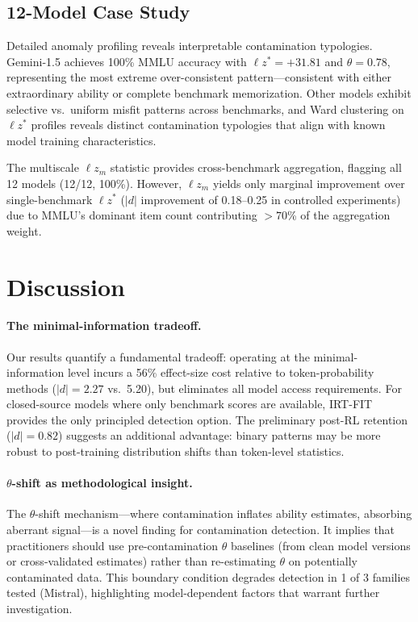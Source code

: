 \documentclass[11pt,a4paper]{article}
\begin{document}
\subsection{12-Model Case Study}

Detailed anomaly profiling reveals interpretable contamination typologies.
Gemini-1.5 achieves 100\% MMLU accuracy with $\ell z^*{=}+31.81$ and $\theta{=}0.78$, representing the most extreme over-consistent pattern---consistent with either extraordinary ability or complete benchmark memorization.
Other models exhibit selective vs.\ uniform misfit patterns across benchmarks, and Ward clustering on $\ell z^*$ profiles reveals distinct contamination typologies that align with known model training characteristics.

The multiscale $\ell z_m$ statistic \citep{hong2021multiscale} provides cross-benchmark aggregation, flagging all 12 models (12/12, 100\%).
However, $\ell z_m$ yields only marginal improvement over single-benchmark $\ell z^*$ ($|d|$ improvement of 0.18--0.25 in controlled experiments) due to MMLU's dominant item count contributing ${>}70$\% of the aggregation weight.

\section{Discussion}
\label{sec:discussion}

\paragraph{The minimal-information tradeoff.}
Our results quantify a fundamental tradeoff: operating at the minimal-information level incurs a 56\% effect-size cost relative to token-probability methods ($|d|{=}2.27$ vs.\ 5.20), but eliminates all model access requirements.
For closed-source models where only benchmark scores are available, \textsc{IRT-FIT} provides the only principled detection option.
The preliminary post-RL retention ($|d|{=}0.82$) suggests an additional advantage: binary patterns may be more robust to post-training distribution shifts than token-level statistics.

\paragraph{$\theta$-shift as methodological insight.}
The $\theta$-shift mechanism---where contamination inflates ability estimates, absorbing aberrant signal---is a novel finding for contamination detection.
It implies that practitioners should use pre-contamination $\theta$ baselines (from clean model versions or cross-validated estimates) rather than re-estimating $\theta$ on potentially contaminated data.
This boundary condition degrades detection in 1 of 3 families tested (Mistral), highlighting model-dependent factors that warrant further investigation.
\end{document}
